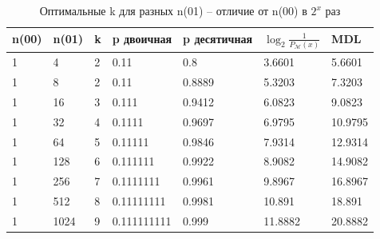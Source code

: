 \documentclass[12pt]{article}
\begin{document}
	
	
	\begin{table}[!h]
		\caption{Оптимальные k для разных n(01) -- отличие от n(00) в $2^x$ раз}
		\label{table:n00n01}
		\begin{center}
			\begin{tabular}{|l|l|l|l|l|l|l|}
				\hline
				n(00) & n(01) & k & p двоичная & p десятичная & $\log_2{\frac{1}{P_{\mathcal{M}}(x)}}$ & MDL \\
				\hline
				1 & 4 & 2 & 0.11 & 0.8 & 3.6601 & 5.6601 \\ 
				\hline 
				1 & 8 & 2 & 0.11 & 0.8889 & 5.3203 & 7.3203 \\ 
				\hline 
				1 & 16 & 3 & 0.111 & 0.9412 & 6.0823 & 9.0823 \\ 
				\hline 
				1 & 32 & 4 & 0.1111 & 0.9697 & 6.9795 & 10.9795 \\ 
				\hline 
				1 & 64 & 5 & 0.11111 & 0.9846 & 7.9314 & 12.9314 \\ 
				\hline 
				1 & 128 & 6 & 0.111111 & 0.9922 & 8.9082 & 14.9082 \\ 
				\hline 
				1 & 256 & 7 & 0.1111111 & 0.9961 & 9.8967 & 16.8967 \\ 
				\hline 
				1 & 512 & 8 & 0.11111111 & 0.9981 & 10.891 & 18.891 \\ 
				\hline 
				1 & 1024 & 9 & 0.111111111 & 0.999 & 11.8882 & 20.8882 \\ 
				\hline 
			\end{tabular}
		\end{center}
	\end{table}
	
\end{document}
